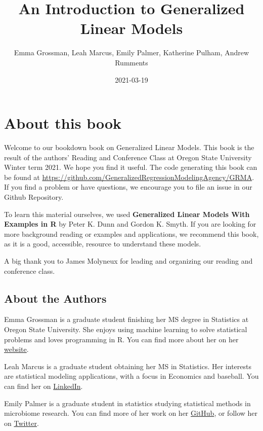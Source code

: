 \documentclass[
]{book}
\title{An Introduction to Generalized Linear Models}
\author{Emma Grossman, Leah Marcus, Emily Palmer, Katherine Pulham, Andrew Rumments}
\date{2021-03-19}
\begin{document}
\maketitle

{
\setcounter{tocdepth}{1}
\tableofcontents
}
\hypertarget{about-this-book}{%
\chapter{About this book}\label{about-this-book}}

Welcome to our bookdown book on Generalized Linear Models. This book is the result of the authors' Reading and Conference Class at Oregon State University Winter term 2021. We hope you find it useful. The code generating this book can be found at \url{https://github.com/GeneralizedRegressionModelingAgency/GRMA}. If you find a problem or have questions, we encourage you to file an issue in our Github Repository.

To learn this material ourselves, we used \textbf{Generalized Linear Models With Examples in R} by Peter K. Dunn and Gordon K. Smyth\citep{dunn2018generalized}. If you are looking for more background reading or examples and applications, we recommend this book, as it is a good, accessible, resource to understand these models.

A big thank you to James Molyneux for leading and organizing our reading and conference class.

\hypertarget{about-the-authors}{%
\section{About the Authors}\label{about-the-authors}}

Emma Grossman is a graduate student finishing her MS degree in Statistics at Oregon State University. She enjoys using machine learning to solve statistical problems and loves programming in R. You can find more about her on her \href{https://www.emmaleda.com}{website}.

Leah Marcus is a graduate student obtaining her MS in Statistics. Her interests are statistical modeling applications, with a focus in Economics and baseball. You can find her on \href{https://www.linkedin.com/in/leah-marcus-11aa59207/}{LinkedIn}.

Emily Palmer is a graduate student in statistics studying statistical methods in microbiome research. You can find more of her work on her \href{https://github.com/empalmer}{GitHub}, or follow her on \href{https://twitter.com/emilymmpalmer}{Twitter}.
\end{document}
